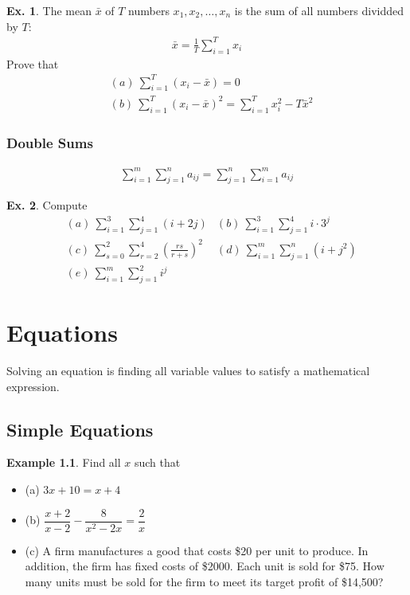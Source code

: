 \documentclass[10pt,a4paper]{book}
\theoremstyle{definition}\newtheorem{definition}{Definition}
\theoremstyle{definition}\newtheorem{fact}{Fact}
\theoremstyle{definition}\newtheorem{ex}{Ex.}
\theoremstyle{definition}\newtheorem{project}{Project}
\theoremstyle{definition}\newtheorem{problem}{Problem}
\theoremstyle{definition}\newtheorem{example}{Example}
\numberwithin{theorem}{chapter}
\numberwithin{corollary}{chapter}
\numberwithin{assumption}{chapter}
\numberwithin{definition}{chapter}
\numberwithin{prop}{chapter}
\numberwithin{notation}{chapter}
\numberwithin{problem}{chapter}
\numberwithin{example}{chapter}
\numberwithin{fact}{chapter}
\numberwithin{ex}{chapter}
\begin{document}
	\begin{ex}
		The mean $\bar{x}$ of $T$ numbers $x_1, x_2, \dots, x_n$ is the sum of all numbers dividded by $T$:
		\begin{align*}
			\bar{x} = \frac{1}{T} \sum^T_{i=1} x_i 
		\end{align*}
		Prove that
		\begin{align*}
			& (a) \ \sum^T_{i=1} (x_i - \bar{x}) = 0                                  \\
			& (b) \ \sum^T_{i=1} (x_i - \bar{x})^2 = \sum^T_{i=1} x_i^2 - T \bar{x}^2 
		\end{align*}
	\end{ex}
	
	\subsection{Double Sums}
	\begin{align*}
		\sum^m_{i=1}\sum^n_{j=1} a_{ij} = \sum^n_{j=1}\sum^m_{i=1} a_{ij} 
	\end{align*}
	
	\begin{ex}
		Compute
		\begin{align*}
			& (a) \ \sum^3_{i=1}\sum^4_{j=1} (i+2j)                        
			& (b) \ \sum^3_{i=1}\sum^4_{j=1} i \cdot 3^j                   \\
			& (c) \ \sum^2_{s=0}\sum^4_{r=2} \left(\frac{rs}{r+s}\right)^2 
			& (d) \ \sum^m_{i=1}\sum^n_{j=1} (i+j^2)                       \\
			& (e) \ \sum^m_{i=1} \sum^2_{j=1} i^j                          
		\end{align*}
	\end{ex}
	
	\chapter{Equations}
	Solving an equation is finding all variable values to satisfy a mathematical expression.
	
	\section{Simple Equations}
	\begin{example}
		Find all $x$ such that
		\begin{itemize}
			\item (a) $3x + 10 = x + 4$ \\
			\item (b) $\dfrac{x+2}{x-2} - \dfrac{8}{x^2 - 2x} = \dfrac{2}{x}$ \\
			\item (c) A firm manufactures a good that costs \$20 per unit to produce. In addition, the firm has fixed costs of \$2000. Each unit is sold for \$75. How many units must be sold for the firm to meet its target profit of \$14,500?
		\end{itemize}
	\end{example}
	
\end{document}
